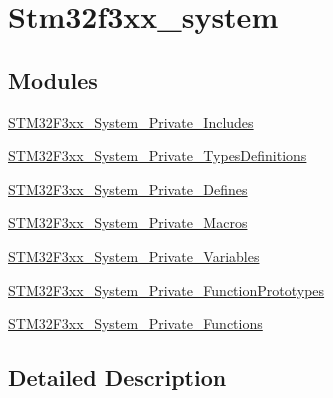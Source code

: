 \hypertarget{group__stm32f3xx__system}{}\section{Stm32f3xx\+\_\+system}
\label{group__stm32f3xx__system}
\subsection*{Modules}
\begin{DoxyCompactItemize}
\item 
\mbox{\hyperlink{group___s_t_m32_f3xx___system___private___includes}{S\+T\+M32\+F3xx\+\_\+\+System\+\_\+\+Private\+\_\+\+Includes}}
\item 
\mbox{\hyperlink{group___s_t_m32_f3xx___system___private___types_definitions}{S\+T\+M32\+F3xx\+\_\+\+System\+\_\+\+Private\+\_\+\+Types\+Definitions}}
\item 
\mbox{\hyperlink{group___s_t_m32_f3xx___system___private___defines}{S\+T\+M32\+F3xx\+\_\+\+System\+\_\+\+Private\+\_\+\+Defines}}
\item 
\mbox{\hyperlink{group___s_t_m32_f3xx___system___private___macros}{S\+T\+M32\+F3xx\+\_\+\+System\+\_\+\+Private\+\_\+\+Macros}}
\item 
\mbox{\hyperlink{group___s_t_m32_f3xx___system___private___variables}{S\+T\+M32\+F3xx\+\_\+\+System\+\_\+\+Private\+\_\+\+Variables}}
\item 
\mbox{\hyperlink{group___s_t_m32_f3xx___system___private___function_prototypes}{S\+T\+M32\+F3xx\+\_\+\+System\+\_\+\+Private\+\_\+\+Function\+Prototypes}}
\item 
\mbox{\hyperlink{group___s_t_m32_f3xx___system___private___functions}{S\+T\+M32\+F3xx\+\_\+\+System\+\_\+\+Private\+\_\+\+Functions}}
\end{DoxyCompactItemize}


\subsection{Detailed Description}

